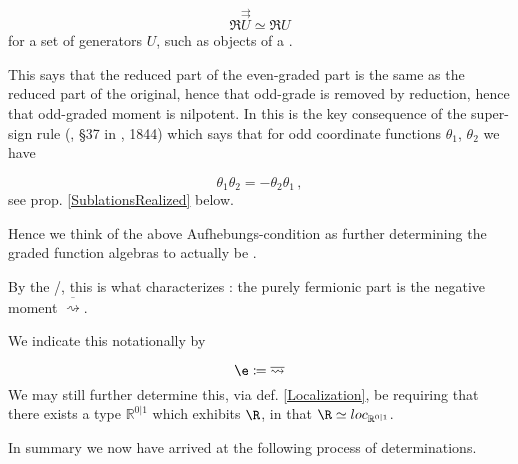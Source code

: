 \documentclass[12pt,titlepage]{article}
\theoremstyle{plain}
\theoremstyle{definition}
\theoremstyle{remark}
\begin{document}
\begin{displaymath}
\Re \stackrel{\rightrightarrows}{U} \simeq \Re U
\end{displaymath}
for a set of generators $U$, such as objects of a .

This says that the reduced part of the even-graded part is the same as the reduced part of the original, hence that odd-grade is removed by reduction, hence that odd-graded moment is nilpotent. In  this is the key consequence of the super-sign rule (, §37 in \emph{}, 1844) which says that for odd coordinate functions $\theta_1$, $\theta_2$ we have

\begin{displaymath}
\theta_1 \theta_2 = -\theta_2 \theta_1
  \,,
\end{displaymath}
see prop. \ref{SublationsRealized} below.

Hence we think of the above Aufhebungs-condition as further determining the graded function algebras to actually be .

By the /, this is what characterizes : the purely fermionic part is the negative moment $\overline{\rightsquigarrow}$.

We indicate this notationally by

\begin{displaymath}
\e \coloneqq \overline{\rightsquigarrow}
\end{displaymath}
We may still further determine this, via def. \ref{Localization}, be requiring that there exists a type $\mathbb{R}^{0|1}$ which exhibits $\R$, in that $\R \simeq loc_{\mathbb{R}^{0|1}}$.

In summary we now have arrived at the following process of determinations.
\end{document}
